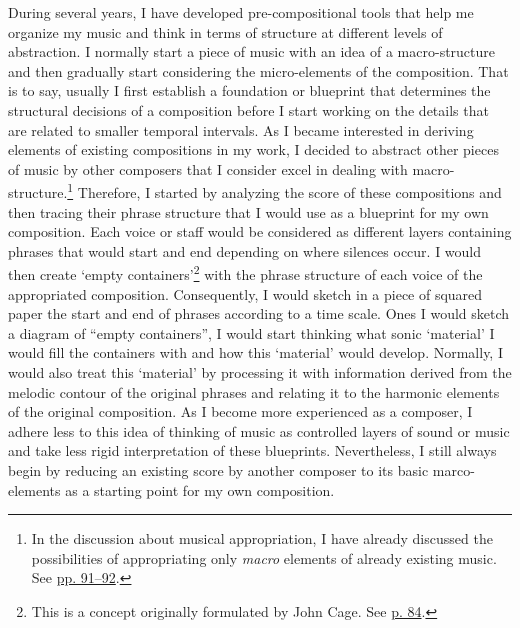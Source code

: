 During several years, I have developed pre-compositional tools that help me organize my music and think in terms of structure at different levels of abstraction. I normally start a piece of music with an idea of a macro-structure and then gradually start considering the micro-elements of the composition. That is to say, usually I first establish a foundation or blueprint that determines the structural decisions of a composition before I start working on the details that are related to smaller temporal intervals. As I became interested in deriving elements of existing compositions in my work, I decided to abstract other pieces of music by other composers that I consider excel in dealing with macro-structure.\footnote{In the discussion about musical appropriation, I have already discussed the possibilities of appropriating only \emph{macro} elements of already existing music. See \hyperlink{macroplunder}{pp. 91--92}.} Therefore, I started by analyzing the score of these compositions and then tracing their phrase structure that I would use as a blueprint for my own composition. Each voice or staff would be considered as different layers containing phrases that would start and end depending on where silences occur. I would then create `empty containers'\footnote{This is a concept originally formulated by John Cage. See \hyperlink{landscape5}{p. 84}.} with the phrase structure of each voice of the appropriated composition. Consequently, I would sketch in a piece of squared paper the start and end of phrases according to a time scale. Ones I would sketch a diagram of ``empty containers'', I would start thinking what sonic `material' I would fill the containers with and how this `material' would develop. Normally, I would also treat this `material' by processing it with information derived from the melodic contour of the original phrases and relating it to the harmonic elements of the original composition. As I become more experienced as a composer, I adhere less to this idea of thinking of music as controlled layers of sound or music and take less rigid interpretation of these blueprints. Nevertheless, I still always begin by reducing an existing score by another composer to its basic marco-elements as a starting point for my own composition. 

